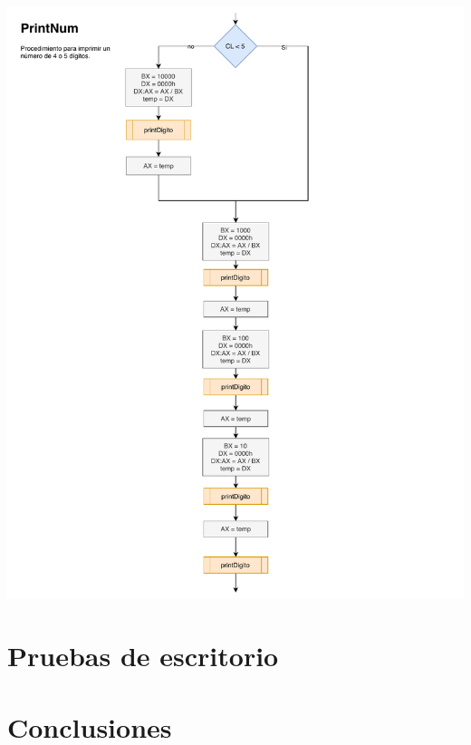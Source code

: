 \documentclass[letterpaper,12 pt,titlepage]{article}
\begin{document}
\begin{center}
        \includegraphics[width=1\textwidth]{img/diagramas/p01-PrintNum.pdf}
    \end{center}

    \section{Pruebas de escritorio}
    \section{Conclusiones}
\end{document}

